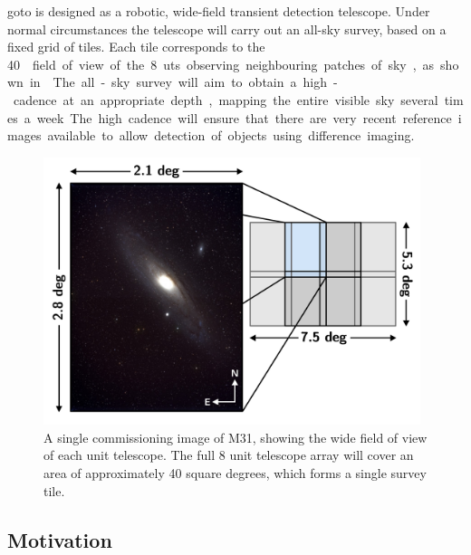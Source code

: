 \begin{colsection}
\begin{colsection}
\gls{goto} is designed as a robotic, wide-field transient detection telescope. Under normal circumstances the telescope will carry out an all-sky survey, based on a fixed grid of tiles. Each tile corresponds to the \SI{40}{\square\deg} field of view of the 8 \glspl{ut} observing neighbouring patches of sky, as shown in . The all-sky survey will aim to obtain a high-cadence at an appropriate depth, mapping the entire visible sky several times a week. The high cadence will ensure that there are very recent reference images available to allow detection of objects using difference imaging.

\begin{figure}[t]
    \begin{center}
        \includegraphics[width=11cm]{images/tiles.pdf}
    \end{center}
    \caption[M31]{
        A single commissioning image of M31, showing the wide field of view of each unit telescope. The full 8 unit telescope array will cover an area of approximately 40 square degrees, which forms a single survey tile.
    }\label{fig:tiles}
\end{figure}

\end{colsection}


\subsection{Motivation}
\label{sec:goto_motivation}
\begin{colsection}


\end{colsection}


\end{colsection}
